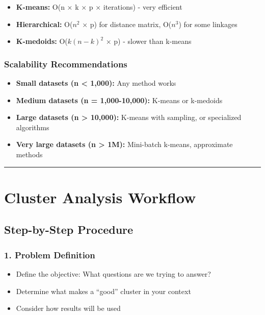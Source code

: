 \documentclass[
]{article}
\begin{document}
\begin{itemize}
\item
  \textbf{K-means:} O(n × k × p × iterations) - very efficient
\item
  \textbf{Hierarchical:} O(\(n^{2}\) × p) for distance matrix,
  O(\(n^{3}\)) for some linkages
\item
  \textbf{K-medoids:} O(\(k(n - k)^{2}\) × p) - slower than k-means
\end{itemize}

\subsubsection{Scalability Recommendations}

\begin{itemize}
\item
  \textbf{Small datasets (n \textless{} 1,000):} Any method works
\item
  \textbf{Medium datasets (n = 1,000-10,000):} K-means or k-medoids
\item
  \textbf{Large datasets (n \textgreater{} 10,000):} K-means with
  sampling, or specialized algorithms
\item
  \textbf{Very large datasets (n \textgreater{} 1M):} Mini-batch
  k-means, approximate methods
\end{itemize}

\begin{center}\rule{0.5\linewidth}{0.5pt}\end{center}

\textbf{ }

\section{Cluster Analysis Workflow}

\textbf{ }

\subsection{Step-by-Step Procedure}

\subsubsection{1. Problem Definition}

\begin{itemize}
\item
  Define the objective: What questions are we trying to answer?
\item
  Determine what makes a ``good'' cluster in your context
\item
  Consider how results will be used
\end{itemize}
\end{document}
